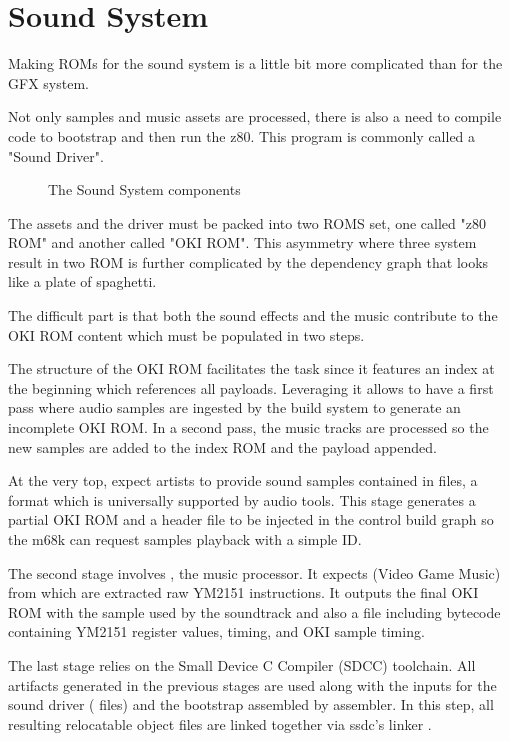 \chapter{Sound System}
Making ROMs for the sound system is a little bit more complicated than for the GFX system. 

Not only samples and music assets are processed, there is also a need to compile code to bootstrap and then run the z80. This program is commonly called a "Sound Driver".

\begin{figure}[H]
\caption*{The Sound System components}
\end{figure}

The assets and the driver must be packed into two ROMS set, one called "z80 ROM" and another called "OKI ROM". This asymmetry where three system result in two ROM is further complicated by the dependency graph that looks like a plate of spaghetti. 

The difficult part is that both the sound effects and the music contribute to the OKI ROM content which must be populated in two steps.




The structure of the OKI ROM facilitates the task since it features an index at the beginning which references all payloads. Leveraging it allows to have a first pass where audio samples are ingested by the build system to generate an incomplete OKI ROM. In a second pass, the music tracks are processed so the new samples are added to the index ROM and the payload appended.

At the very top,  expect artists to provide sound samples contained in  files, a format which is universally supported by audio tools. This stage generates a partial OKI ROM and a  header file to be injected in the control build graph so the m68k can request samples playback with a simple ID.

The second stage involves , the music processor. It expects  (Video Game Music) from which are extracted raw YM2151 instructions. It outputs the final OKI ROM with the sample used by the soundtrack and also a  file including bytecode containing YM2151 register values, timing, and OKI sample timing.

The last stage relies on the Small Device C Compiler (SDCC) toolchain. All artifacts generated in the previous stages are used along with the inputs for the sound driver ( files) and the bootstrap  assembled by  assembler. In this step, all resulting relocatable object files  are linked together via ssdc's linker . 


